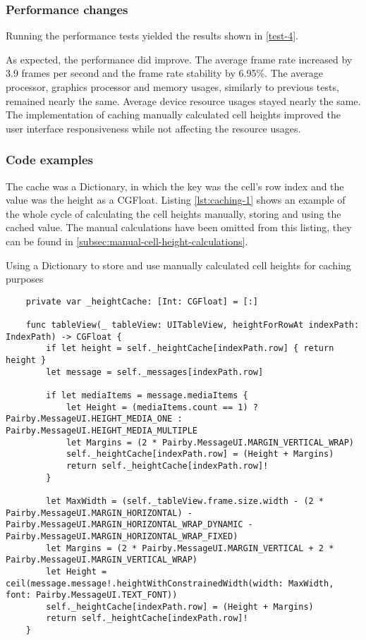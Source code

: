 \documentclass[a4paper,12pt]{article}
\begin{document}
\subsubsection{Performance changes}
Running the performance tests yielded the results shown in \autoref{test-4}.

As expected, the performance did improve. The average frame rate increased by 3.9 frames per second and the frame rate stability by 6.95\%. The average processor, graphics processor and memory usages, similarly to previous tests, remained nearly the same. Average device resource usages stayed nearly the same. The implementation of caching manually calculated cell heights improved the user interface responsiveness while not affecting the resource usages.

\subsubsection{Code examples}
The cache was a Dictionary, in which the key was the cell's row index and the value was the height as a CGFloat. Listing \autoref{lst:caching-1} shows an example of the whole cycle of calculating the cell heights manually, storing and using the cached value. The manual calculations have been omitted from this listing, they can be found in \autoref{subsec:manual-cell-height-calculations}. 
\begin{listing}[H]
  \caption{Using a Dictionary to store and use manually calculated cell heights for caching purposes}
  \label{lst:caching-1}
  \begin{verbatim}
    private var _heightCache: [Int: CGFloat] = [:]

    func tableView(_ tableView: UITableView, heightForRowAt indexPath: IndexPath) -> CGFloat {
        if let height = self._heightCache[indexPath.row] { return height }
        let message = self._messages[indexPath.row]

        if let mediaItems = message.mediaItems {
            let Height = (mediaItems.count == 1) ? Pairby.MessageUI.HEIGHT_MEDIA_ONE : Pairby.MessageUI.HEIGHT_MEDIA_MULTIPLE
            let Margins = (2 * Pairby.MessageUI.MARGIN_VERTICAL_WRAP)
            self._heightCache[indexPath.row] = (Height + Margins)
            return self._heightCache[indexPath.row]!
        }

        let MaxWidth = (self._tableView.frame.size.width - (2 * Pairby.MessageUI.MARGIN_HORIZONTAL) - Pairby.MessageUI.MARGIN_HORIZONTAL_WRAP_DYNAMIC - Pairby.MessageUI.MARGIN_HORIZONTAL_WRAP_FIXED)
        let Margins = (2 * Pairby.MessageUI.MARGIN_VERTICAL + 2 * Pairby.MessageUI.MARGIN_VERTICAL_WRAP)
        let Height = ceil(message.message!.heightWithConstrainedWidth(width: MaxWidth, font: Pairby.MessageUI.TEXT_FONT))
        self._heightCache[indexPath.row] = (Height + Margins)
        return self._heightCache[indexPath.row]!
    }
  \end{verbatim}
\end{listing}
\end{document}
